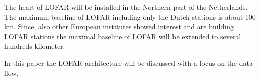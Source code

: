 \documentclass[journal]{IEEEtran}
\begin{document}
The heart of LOFAR will be installed in the Northern part of the Netherlands. The maximum baseline of LOFAR including only the Dutch stations is about 100 km. Since, also other European institutes showed interest and are building LOFAR stations the maximal baseline of LOFAR will be extended to several hundreds kilometer.  

In this paper the LOFAR architecture will be discussed with a focus on the data flow.

 





%
%

\end{document}
